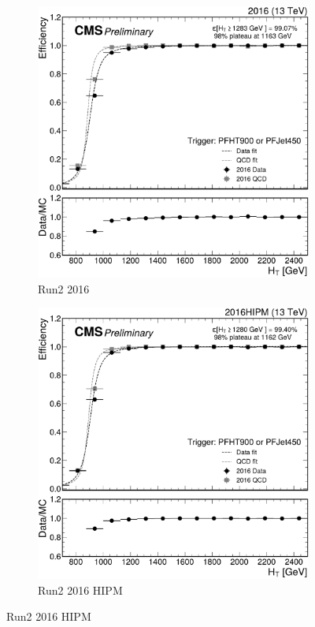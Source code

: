 \begin{figure}
	\centering
	\begin{subfigure}{.45\textwidth}
		\includegraphics[width=\linewidth]{Images/pdfs/16_efficiency_withratio_and_fits.pdf}
		\caption{Run2 2016}
		\label{fig:HT_eff_16}
	\end{subfigure}
	\begin{subfigure}{.45\textwidth}
		\includegraphics[width=\linewidth]{Images/pdfs/16-APV-HIPM_efficiency_withratio_and_fits.pdf}
		\caption{Run2 2016 HIPM}
		\label{fig:HT_eff_16_HIPM}
	\end{subfigure}


\end{figure}
